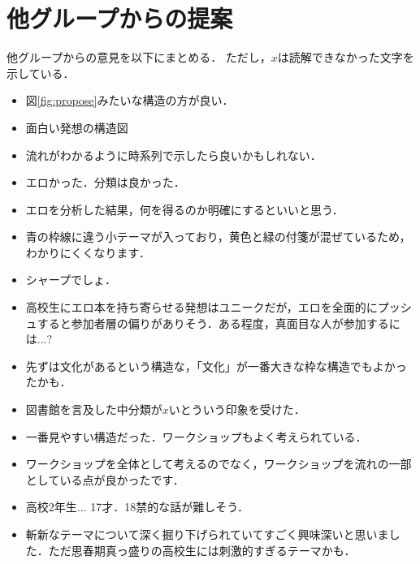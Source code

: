 \documentclass[uplatex,a4paper]{jsarticle}
\begin{document}
\section{他グループからの提案}
他グループからの意見を以下にまとめる．
ただし，$x$は読解できなかった文字を示している．
\begin{itemize}
    \item 図\ref{fig:propose}みたいな構造の方が良い．
    \item 面白い発想の構造図
    \item 流れがわかるように時系列で示したら良いかもしれない．
    \item エロかった．分類は良かった．
    \item エロを分析した結果，何を得るのか明確にするといいと思う．
    \item 青の枠線に違う小テーマが入っており，黄色と緑の付箋が混ぜているため，わかりにくくなります．
    \item シャープでしょ．
    \item 高校生にエロ本を持ち寄らせる発想はユニークだが，エロを全面的にプッシュすると参加者層の偏りがありそう．ある程度，真面目な人が参加するには...?
    \item 先ずは文化があるという構造な，「文化」が一番大きな枠な構造でもよかったかも．
    \item 図書館を言及した中分類が$x$いとういう印象を受けた．
    \item 一番見やすい構造だった．ワークショップもよく考えられている．
    \item ワークショップを全体として考えるのでなく，ワークショップを流れの一部としている点が良かったです．
    \item 高校2年生... 17才．18禁的な話が難しそう．
    \item 斬新なテーマについて深く掘り下げられていてすごく興味深いと思いました．ただ思春期真っ盛りの高校生には刺激的すぎるテーマかも．
\end{itemize}
\end{document}
